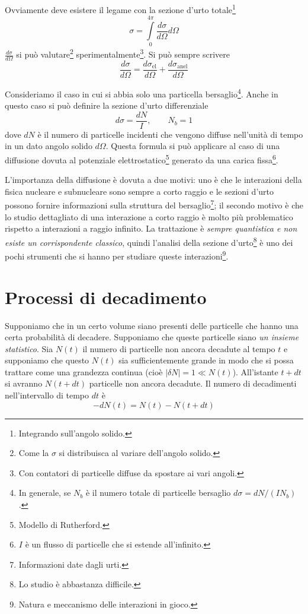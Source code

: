 Ovviamente deve esistere il legame con la sezione d'urto 
totale\footnote{Integrando sull'angolo solido. }
\begin{equation}
 \sigma = \int\limits^{4\pi}_0\frac{d\sigma}{d\Omega}d\Omega
\end{equation}
$\frac{d\sigma}{d\Omega}$ si può valutare\footnote{Come la $\sigma$ si 
distribuisca al variare dell'angolo solido. } sperimentalmente\footnote{Con 
contatori di particelle diffuse da spostare ai vari angoli. }. Si può sempre 
scrivere
\[
\frac{d\sigma}{d\Omega} = \frac{d\sigma_\text{el}}{d\Omega} + 
\frac{d\sigma_\text{anel}}{d\Omega}
\]

Consideriamo il caso in cui si abbia solo una particella bersaglio\footnote{In 
generale, se $N_b$ è il numero totale di particelle bersaglio $d\sigma = 
dN/(IN_b)$. }. Anche in questo caso si può definire la sezione d'urto 
differenziale
\[
d\sigma = \frac{dN}{I}, \qquad N_b = 1
\]
dove $dN$ è il numero di particelle incidenti che vengono diffuse nell'unità 
di tempo in un dato angolo solido $d\Omega$. Questa formula si può applicare 
al caso di una diffusione dovuta al potenziale elettrostatico\footnote{Modello 
di Rutherford. } generato da una carica fissa\footnote{$I$ è un flusso di 
particelle che si estende all'infinito. }.

L'importanza della diffusione è dovuta a due motivi: uno è che le interazioni 
della fisica nucleare e subnucleare  sono sempre a corto raggio e le sezioni 
d'urto possono fornire informazioni sulla struttura del 
bersaglio\footnote{Informazioni date dagli urti. }; il secondo motivo è che lo 
studio dettagliato di una interazione a corto raggio è molto più problematico 
rispetto a interazioni a raggio infinito. La trattazione è \textit{sempre 
quantistica e non esiste un corrispondente classico}, quindi l'analisi della 
sezione d'urto\footnote{Lo studio è abbastanza difficile. } è uno dei pochi 
strumenti che si hanno per studiare queste interazioni\footnote{Natura e 
meccanismo delle interazioni in gioco. }.

\section{Processi di decadimento}


Supponiamo che in un certo volume siano presenti delle particelle che hanno una 
certa probabilità di decadere. Supponiamo che queste particelle siano 
\textit{un insieme statistico}. Sia $N(t)$ il numero di particelle non ancora 
decadute al tempo $t$ e supponiamo che questo $N(t)$ sia sufficientemente 
grande in modo che si possa trattare come una grandezza continua (cioè $\lvert 
\delta N\rvert = 1 \ll N(t)$). All'istante $t + dt$ si avranno $N(t+dt)$ 
particelle non ancora decadute. Il numero di decadimenti nell'intervallo di 
tempo $dt$ è
\[
-dN(t) = N(t) - N(t+dt)
\]

